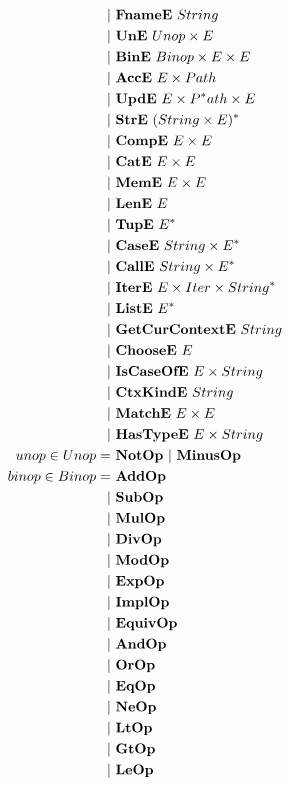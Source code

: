 \begin{align*}
    | & ~ \fnamee ~ String \\
    | & ~ \une ~ Unop \times E \\
    | & ~ \bine ~ Binop \times E \times E \\
    | & ~ \acce ~ E \times Path \\
    | & ~ \upde ~ E \times \seq Path \times E \\
    | & ~ \stre ~ \seq{(String \times E)} \\
    | & ~ \compe ~ E \times E \\
    | & ~ \cate ~ E \times E \\
    | & ~ \meme ~ E \times E \\
    | & ~ \lene ~ E \\
    | & ~ \tupe ~ \seq E \\
    | & ~ \casee ~ String \times \seq E \\
    | & ~ \calle ~ String \times \seq E \\
    | & ~ \itere ~ E \times Iter \times \seq{String} \\
    | & ~ \liste ~ \seq E \\
    | & ~ \getcurctxe ~ String \\
    | & ~ \choosee ~ E \\
    | & ~ \iscaseofe ~ E \times String \\
    | & ~ \ctxkinde ~ String \\
    | & ~ \matche ~ E \times E \\
    | & ~ \hastypee ~ E \times String \\
%
  unop \in Unop =& ~ \notop ~ | ~ \minusop \\
  binop \in Binop =& ~ \addop \\
    | & ~ \subop \\
    | & ~ \mulop \\
    | & ~ \divop \\
    | & ~ \modop \\
    | & ~ \expop \\
    | & ~ \implop \\
    | & ~ \equivop \\
    | & ~ \andop \\
    | & ~ \orop \\
    | & ~ \eqop \\
    | & ~ \neop \\
    | & ~ \ltop \\
    | & ~ \gtop \\
    | & ~ \leop \\

\end{align*}
